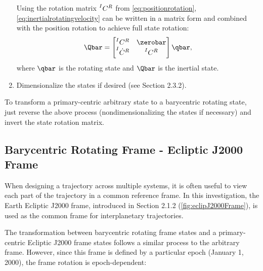 \begin{enumerate}
            Using the rotation matrix $\prescript{I}{}{C}^{R}$ from \cref{eq:positionrotation},
            \cref{eq:inertialrotatingvelocity} can be written in a matrix form and combined with
            the position rotation to achieve full state rotation:
            \begin{equation}
                \Qbar=\begin{bmatrix}   \prescript{I}{}{C}^{R}      &   \zerobar                \\
                                        \prescript{I}{}{\dot{C}}^{R} &   \prescript{I}{}{C}^{R}  \end{bmatrix}\qbar,
                \label{eq:rotation}
            \end{equation}
            where $\qbar$ is the rotating state and $\Qbar$ is the inertial state.
    \item   Dimensionalize the states if desired (see Section 2.3.2).
\end{enumerate}
To transform a primary-centric arbitrary state to a barycentric rotating state, just reverse the
above process (nondimensionalizing the states if necessary) and invert the state rotation matrix.

\subsection{Barycentric Rotating Frame - Ecliptic J2000 Frame}
When designing a trajectory across multiple systems, it is often useful to view each part of the
trajectory in a common reference frame. In this investigation, the Earth Ecliptic J2000 frame,
introduced in Section 2.1.2 (\cref{fig:eclipJ2000Frame}), is used as the common frame for
interplanetary trajectories.

The transformation between barycentric rotating frame states and a primary-centric Ecliptic J2000
frame states follows a similar process to the arbitrary frame. However, since this frame is defined
by a particular epoch (January 1, 2000), the frame rotation is epoch-dependent:

